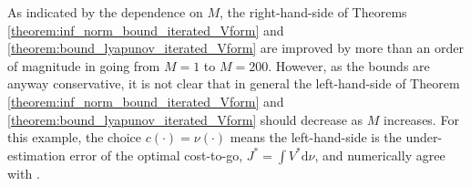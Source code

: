\documentclass[journal]{IEEEtran}
\newcommand{\intd}[1]{\mathrm{d}#1}
\begin{document}
As indicated by the dependence on $M$, the right-hand-side of Theorems \ref{theorem:inf_norm_bound_iterated_Vform} and \ref{theorem:bound_lyapunov_iterated_Vform} are improved by more than an order of magnitude in going from $M\!=\!1$ to $M\!=\!200$. However, as the bounds are anyway conservative, it is not clear that in general the left-hand-side of Theorem \ref{theorem:inf_norm_bound_iterated_Vform} and \ref{theorem:bound_lyapunov_iterated_Vform} should decrease as $M$ increases.
For this example, the choice $c(\cdot) \!=\! \nu(\cdot)$ means the left-hand-side is the under-estimation error of the optimal cost-to-go, $J^\ast \!=\! \int V^\ast \intd{\nu}$, and numerically agree with \cite{boyd_iteratedBellman}.
\end{document}
